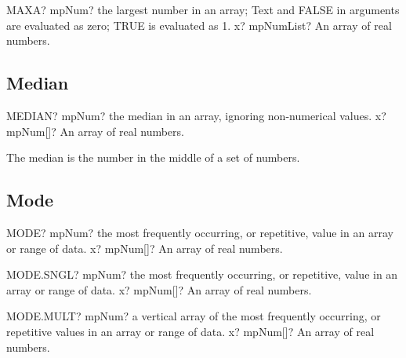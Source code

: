 \vspace{0.6cm}
\begin{mpFunctionsExtract}
	\mpWorksheetFunctionOneNotImplemented
	{MAXA? mpNum? the largest number in an array; Text and FALSE in arguments are evaluated as zero; TRUE is evaluated as 1.}
	{x? mpNumList? An array of real numbers.}
\end{mpFunctionsExtract}





\subsection{Median}

\begin{mpFunctionsExtract}
	\mpWorksheetFunctionOneNotImplemented
	{MEDIAN? mpNum? the median in an array, ignoring non-numerical values.}
	{x? mpNum[]? An array of real numbers.}
\end{mpFunctionsExtract}

\vspace{0.3cm}
The median is the number in the middle of a set of numbers.






\subsection{Mode}


\begin{mpFunctionsExtract}
	\mpWorksheetFunctionOneNotImplemented
	{MODE? mpNum? the most frequently occurring, or repetitive, value in an array or range of data.}
	{x? mpNum[]? An array of real numbers.}
\end{mpFunctionsExtract}

\vspace{0.6cm}
\begin{mpFunctionsExtract}
	\mpWorksheetFunctionOneNotImplemented
	{MODE.SNGL? mpNum? the most frequently occurring, or repetitive, value in an array or range of data.}
	{x? mpNum[]? An array of real numbers.}
\end{mpFunctionsExtract}


\vspace{0.6cm}
\begin{mpFunctionsExtract}
	\mpWorksheetFunctionOneNotImplemented
	{MODE.MULT? mpNum? a vertical array of the most frequently occurring, or repetitive values in an array or range of data.}
	{x? mpNum[]? An array of real numbers.}
\end{mpFunctionsExtract}

